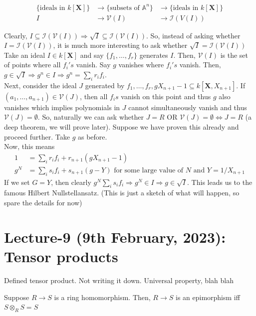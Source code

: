 \documentclass[oneside, 12pt]{scrbook}
\newcommand{\V}{\mathcal{V}}
\newcommand{\I}{\mathcal{I}}
\newcommand{\Aa}{\mathbb{A}}
\theoremstyle{theorem}
\begin{document}
\begin{align*}
\{\text{ideals in } k[\mathbf{X}]\} &\rightarrow \{ \text{subsets of }  \Aa^n\} &\rightarrow \{ \text{ideals in }  k[\mathbf{X}]\}\\
I &\rightarrow \V(I) &\rightarrow \I(V(I))
\end{align*}

Clearly, $I \subseteq \I(\V(I)) \Rightarrow \sqrt{I} \subseteq \I(\V(I))$. So, instead of asking whether $I = \I(\V(I))$, it is much more interesting to ask whether $\sqrt{I} = \I(\V(I))$ \\


Take an ideal $I \in k [\mathbf{X}]$ and say $\{f_{1}, \hdots , f_{r} \}$ generates $I$. Then, $\V(I)$ is the set of points where all $f_{i}'s$ vanish. Say $g$ vanishes where $f_{i}'s$ vanish. Then, $g \in \sqrt{I} \Rightarrow g^n \in I \Rightarrow g^n = \sum_{i} r_{i}f_{i}$. \\

Next, consider the ideal $J$ generated by $f_{1}, \hdots , f_{r}, gX_{n+1}-1 \subseteq k[\mathbf{X},X_{n+1}]$. If $(a_{1}, \hdots , a_{n+1}) \in \V(J)$, then all $f_{i}s$ vanish on this point and thus $g$ also vanishes which implies polynomials in $J$ cannot simultaneously vanish and thus $\V(J)=\emptyset$. So, naturally we can ask whether $J=R$ OR $\V(J)= \emptyset \Leftrightarrow J=R$ (a deep theorem, we will prove later). Suppose we have proven this already and proceed further. Take $g$ as before. \\

Now, this means 
\begin{align*}
1 &= \sum_{i} r_{i}f_{i} + r_{n+1}(gX_{n+1}-1) \\
g^N &= \sum_{i} s_{i}f_{i}  + s_{n+1}(g-Y) \text{  for some large value of }N \text{ and } Y = 1/X_{n+1}
\end{align*} 
If we set $G=Y$, then clearly $g^N \sum_{i} s_{i}f_{i} \Rightarrow g^N \in I \Rightarrow g \in \sqrt{I}$. This leads us to the famous Hilbert Nullstellansatz. (This is just a sketch of what will happen, so spare the details for now)


\chapter{Lecture-9 (9th February, 2023): Tensor products}

Defined tensor product. Not writing it down. Universal property, blah blah 

\begin{theorem}
Suppose $R\rightarrow S$ is a ring homomorphism. Then, $R \rightarrow S$ is an epimorphism iff $S \otimes_{R} S = S$
\end{theorem}
\end{document}
